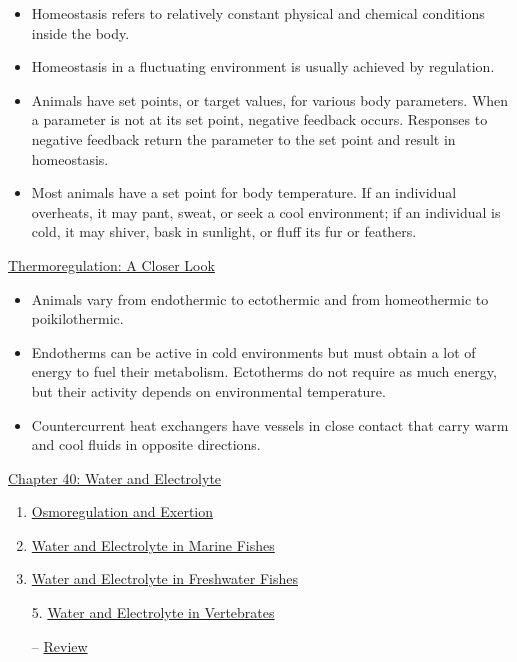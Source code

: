 \documentclass[12pt,letterpaper]{article}
\newcommand{\thetitle}{\hypertarget{home}{Animals and Ecology}}
\begin{document}
    \begin{itemize}
            \item Homeostasis refers to relatively constant physical and chemical conditions inside the body. 
            \item Homeostasis in a fluctuating environment is usually achieved by regulation. 
            \item Animals have set points, or target values, for various body parameters. When a parameter is not at its set point, negative feedback occurs. Responses to negative feedback return the parameter to the set point and result in homeostasis. 
            \item Most animals have a set point for body temperature. If an individual overheats, it may pant, sweat, or seek a cool environment; if an individual is cold, it may shiver, bask in sunlight, or fluff its fur or feathers.
        \end{itemize}
    \hyperlink{39.5}{Thermoregulation: A Closer Look}
    \begin{itemize}
            \item Animals vary from endothermic to ectothermic and from homeothermic to poikilothermic. 
            \item Endotherms can be active in cold environments but must obtain a lot of energy to fuel their metabolism. Ectotherms do not require as much energy, but their activity depends on environmental temperature. 
            \item Countercurrent heat exchangers have vessels in close contact that carry warm and cool fluids in opposite directions.
    \end{itemize}        



\clearpage

\renewcommand{\thetitle}{\hypertarget{40}{Water and Electrolye Balance}}
\hypertarget{40}{}
\setcounter{section}{40}

\begin{chapbox}{\hyperlink{home}{Chapter 40: Water and Electrolyte}}
    \begin{enumerate}
        \item \hyperlink{40.1}{Osmoregulation and Exertion}
        \item \hyperlink{40.2}{Water and Electrolyte in Marine Fishes}
        \item \hyperlink{40.3}{Water and Electrolyte in Freshwater Fishes}
        \item [5.] \hyperlink{40.5}{Water and Electrolyte in Vertebrates}
        \item [--] \hyperlink{40.r}{Review}
    \end{enumerate}
\end{chapbox}
\end{document}
